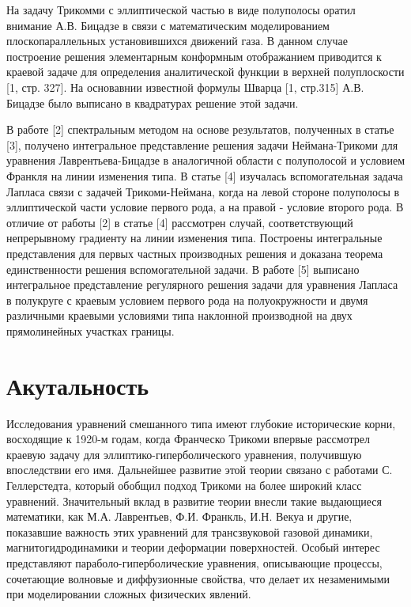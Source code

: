 \documentclass[12pt, a4paper]{article}
\begin{document}
\par
На задачу Трикомми с эллиптической частью в виде полуполосы оратил внимание А.В. Бицадзе в связи с математическим моделированием плоскопараллельных установившихся движений газа. В данном случае построение решения элементарным конформным отображанием приводится к краевой задаче для определения аналитической функции в верхней полуплоскости [1, стр. 327]. На основавнии известной формулы Шварца [1, стр.315] А.В. Бицадзе было выписано в квадратурах решение этой задачи.

\par
В работе [2] спектральным методом на основе результатов, полученных в статье [3], получено интегральное представление решения задачи Неймана-Трикоми для уравнения Лаврентьева-Бицадзе в аналогичной области с полуполосой и условием Франкля на линии изменения типа. В статье [4] изучалась вспомогательная задача Лапласа связи с задачей Трикоми-Неймана, когда на левой стороне полуполосы в эллиптической части условие первого рода, а на правой - условие второго рода. В отличие от работы [2] в статье [4] рассмотрен случай, соответствующий непрерывному градиенту на линии изменения типа. Построены интегральные представления для первых частных производных решения и доказана теорема единственности решения вспомогательной задачи. В работе [5] выписано интегральное представление регулярного решения задачи для уравнения Лапласа в полукруге с краевым условием первого рода на полуокружности и двумя различными краевыми условиями типа наклонной производной на двух прямолинейных участках границы.
\newpage
\section{Акутальность}
Исследования уравнений смешанного типа имеют глубокие исторические корни, восходящие к 1920-м годам, когда Франческо Трикоми впервые рассмотрел краевую задачу для эллиптико-гиперболического уравнения, получившую впоследствии его имя. Дальнейшее развитие этой теории связано с работами С. Геллерстедта, который обобщил подход Трикоми на более широкий класс уравнений. Значительный вклад в развитие теории внесли такие выдающиеся математики, как М.А. Лаврентьев, Ф.И. Франкль, И.Н. Векуа и другие, показавшие важность этих уравнений для трансзвуковой газовой динамики, магнитогидродинамики и теории деформации поверхностей. Особый интерес представляют параболо-гиперболические уравнения, описывающие процессы, сочетающие волновые и диффузионные свойства, что делает их незаменимыми при моделировании сложных физических явлений.
\end{document}
